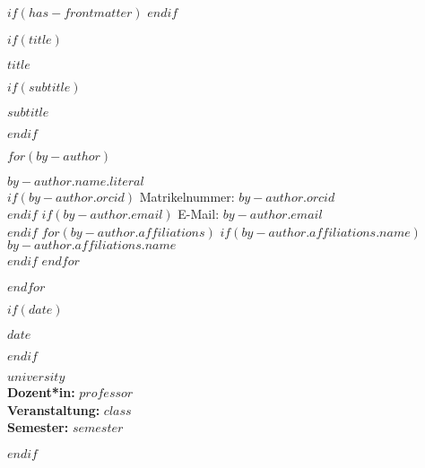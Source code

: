 $if(has-frontmatter)$
\frontmatter
$endif$

$if(title)$
\cleardoublepage %
\thispagestyle{empty} %

\vspace*{2cm} %
\begin{center}
  {\Huge\bfseries $title$ \par} %
  $if(subtitle)$
    \vspace{2ex}
    {\Large\bfseries $subtitle$ \par} %
  $endif$
\end{center}

\vspace{3cm} %

$for(by-author)$
\begin{center}
  {\large\textbf{$by-author.name.literal$}}\\
  $if(by-author.orcid)$ Matrikelnummer: $by-author.orcid$\\ $endif$
  $if(by-author.email)$ E-Mail: $by-author.email$\\ $endif$
  $for(by-author.affiliations)$
    $if(by-author.affiliations.name)$ $by-author.affiliations.name$\\ $endif$
  $endfor$
\end{center}

\vspace{2ex}
$endfor$

\vfill

$if(date)$
\begin{center}
  {\large\textbf{$date$}}
\end{center}
$endif$

\vfill

\begin{flushleft}
  \textbf{$university$}\\
  \textbf{Dozent*in:} $professor$ \\
  \textbf{Veranstaltung:} $class$ \\
  \textbf{Semester:} $semester$
\end{flushleft}

$endif$

\cleardoublepage
{} %
